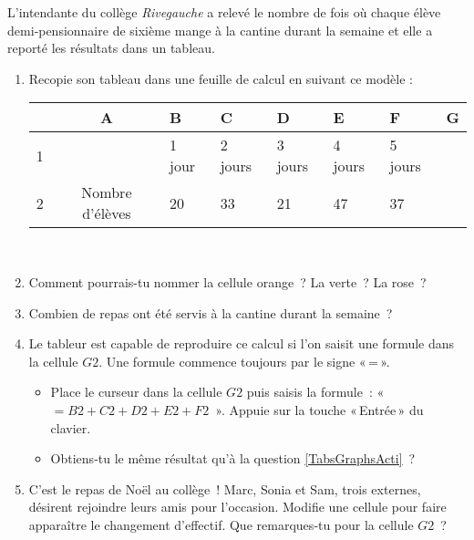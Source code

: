 \begin{activite}

\begin{partie}[À la cantine]
L'intendante du collège \emph{Rivegauche} a relevé le nombre de fois où chaque élève demi‑pensionnaire de sixième mange à la cantine durant la semaine et elle a reporté les résultats dans un tableau.
\begin{enumerate}
 \item Recopie son tableau dans une feuille de calcul en suivant ce modèle :
 \begin{center}
\begin{tabularx}{\linewidth}{|c|c|X|X|X|X|X|X|}
\hline \rowcolor{Gris1} & A & B & C & D & E & F & G \\
\hline \cellcolor{Gris1} 1 & & 1 jour & 2 jours & 3 jours & 4 jours & 5 jours & \\
\hline \cellcolor{Gris1} 2 & \cellcolor{G3} Nombre d'élèves & \cellcolor{J1} 20 & 33 & 21 & 47 & 37 & \cellcolor{B3} \\
\hline
\end{tabularx} \\
\end{center}
\vspace{.5em}
 \item Comment pourrais-tu nommer la cellule orange ? La verte ? La rose ?
 \item Combien de repas ont été servis à la cantine durant la semaine ? \label{TabsGraphsActi}
 \item Le tableur est capable de reproduire ce calcul si l'on saisit une formule dans la cellule $G2$. Une formule commence toujours par le signe «\,=\,». 
  \begin{itemize}
   \item Place le curseur dans la cellule $G2$ puis saisis la formule : « $= B2 + C2 + D2 + E2 + F2$ ». Appuie sur la touche «\,Entrée\,» du clavier. 
   \item Obtiens‑tu le même résultat qu'à la question \ref{TabsGraphsActi} ?
   \end{itemize}
 \item C'est le repas de Noël au collège ! Marc, Sonia et Sam, trois externes, désirent rejoindre leurs amis pour l'occasion. Modifie une cellule pour faire apparaître le changement d'effectif. Que remarques‑tu pour la cellule $G2$ ?
 \end{enumerate}
\end{partie}


\end{activite}
